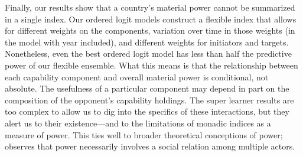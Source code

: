 Finally, our results show that a country's material power cannot be summarized in a single index.
Our ordered logit models construct a flexible index that allows for different weights on the components, variation over time in those weights (in the model with year included), and different weights for initiators and targets.
Nonetheless, even the best ordered logit model has less than half the predictive power of our flexible ensemble.
What this means is that the relationship between each capability component and overall material power is conditional, not absolute.
The usefulness of a particular component may depend in part on the composition of the opponent's capability holdings.
The super learner results are too complex to allow us to dig into the specifics of these interactions, but they alert us to their existence---and to the limitations of monadic indices as a measure of power.
This ties well to broader theoretical conceptions of power; \citet[48]{Dowding1991} observes that power necessarily involves a social relation among multiple actors.


